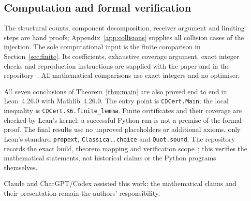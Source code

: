 \documentclass[11pt,letterpaper]{article}
\theoremstyle{definition}
\begin{document}
\subsection*{Computation and formal verification}
The structural counts, component decomposition, receiver argument and
limiting steps are hand proofs; Appendix~\ref{app:collisions} supplies
all collision cases of the injection. The sole computational input is
the finite comparison in Section~\ref{sec:finite}. Its coefficients,
exhaustive coverage argument, exact integer checks and reproduction
instructions are supplied with the paper and in the repository~\cite{LeanRepository}.
All mathematical comparisons use exact integers and no optimiser.

All seven conclusions of Theorem~\ref{thm:main} are also proved end to
end in Lean~4.26.0 with Mathlib~4.26.0. The entry point is
\texttt{CDCert.Main}; the local inequality is \texttt{CDCert.K6.finite\_lemma}.
Finite certificates and their coverage are checked by Lean's kernel:
a successful Python run is not a premise of the formal proof.
The final results use no unproved placeholders or additional axioms,
only Lean's standard \texttt{propext}, \texttt{Classical.choice} and
\texttt{Quot.sound}. The repository records the exact build, theorem
mapping and verification scope~\cite{LeanRepository}; this verifies the
mathematical statements, not historical claims or the Python programs themselves.

Claude and ChatGPT/Codex assisted this work; the mathematical claims
and their presentation remain the authors' responsibility.
\end{document}
